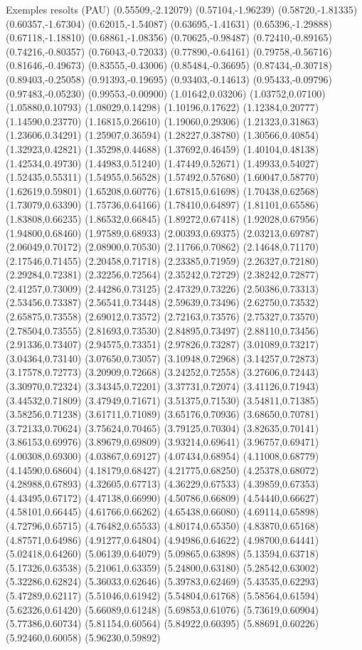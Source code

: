\documentclass[11pt,a4paper]{article}
\begin{document}
\begin{fmex}{Exemples resolts (PAU)}
(0.55509,-2.12079) (0.57104,-1.96239) (0.58720,-1.81335) (0.60357,-1.67304) (0.62015,-1.54087) (0.63695,-1.41631) (0.65396,-1.29888) (0.67118,-1.18810) (0.68861,-1.08356) (0.70625,-0.98487) (0.72410,-0.89165) (0.74216,-0.80357) (0.76043,-0.72033) (0.77890,-0.64161) (0.79758,-0.56716) (0.81646,-0.49673) (0.83555,-0.43006) (0.85484,-0.36695) (0.87434,-0.30718) (0.89403,-0.25058) (0.91393,-0.19695) (0.93403,-0.14613) (0.95433,-0.09796) (0.97483,-0.05230) (0.99553,-0.00900) (1.01642,0.03206) (1.03752,0.07100) (1.05880,0.10793) (1.08029,0.14298) (1.10196,0.17622) (1.12384,0.20777) (1.14590,0.23770) (1.16815,0.26610) (1.19060,0.29306) (1.21323,0.31863) (1.23606,0.34291) (1.25907,0.36594) (1.28227,0.38780) (1.30566,0.40854) (1.32923,0.42821) (1.35298,0.44688) (1.37692,0.46459) (1.40104,0.48138) (1.42534,0.49730) (1.44983,0.51240) (1.47449,0.52671) (1.49933,0.54027) (1.52435,0.55311) (1.54955,0.56528) (1.57492,0.57680) (1.60047,0.58770) (1.62619,0.59801) (1.65208,0.60776) (1.67815,0.61698) (1.70438,0.62568) (1.73079,0.63390) (1.75736,0.64166) (1.78410,0.64897) (1.81101,0.65586) (1.83808,0.66235) (1.86532,0.66845) (1.89272,0.67418) (1.92028,0.67956) (1.94800,0.68460) (1.97589,0.68933) (2.00393,0.69375) (2.03213,0.69787) (2.06049,0.70172) (2.08900,0.70530) (2.11766,0.70862) (2.14648,0.71170) (2.17546,0.71455) (2.20458,0.71718) (2.23385,0.71959) (2.26327,0.72180) (2.29284,0.72381) (2.32256,0.72564) (2.35242,0.72729) (2.38242,0.72877) (2.41257,0.73009) (2.44286,0.73125) (2.47329,0.73226) (2.50386,0.73313) (2.53456,0.73387) (2.56541,0.73448) (2.59639,0.73496) (2.62750,0.73532) (2.65875,0.73558) (2.69012,0.73572) (2.72163,0.73576) (2.75327,0.73570) (2.78504,0.73555) (2.81693,0.73530) (2.84895,0.73497) (2.88110,0.73456) (2.91336,0.73407) (2.94575,0.73351) (2.97826,0.73287) (3.01089,0.73217) (3.04364,0.73140) (3.07650,0.73057) (3.10948,0.72968) (3.14257,0.72873) (3.17578,0.72773) (3.20909,0.72668) (3.24252,0.72558) (3.27606,0.72443) (3.30970,0.72324) (3.34345,0.72201) (3.37731,0.72074) (3.41126,0.71943) (3.44532,0.71809) (3.47949,0.71671) (3.51375,0.71530) (3.54811,0.71385) (3.58256,0.71238) (3.61711,0.71089) (3.65176,0.70936) (3.68650,0.70781) (3.72133,0.70624) (3.75624,0.70465) (3.79125,0.70304) (3.82635,0.70141) (3.86153,0.69976) (3.89679,0.69809) (3.93214,0.69641) (3.96757,0.69471) (4.00308,0.69300) (4.03867,0.69127) (4.07434,0.68954) (4.11008,0.68779) (4.14590,0.68604) (4.18179,0.68427) (4.21775,0.68250) (4.25378,0.68072) (4.28988,0.67893) (4.32605,0.67713) (4.36229,0.67533) (4.39859,0.67353) (4.43495,0.67172) (4.47138,0.66990) (4.50786,0.66809) (4.54440,0.66627) (4.58101,0.66445) (4.61766,0.66262) (4.65438,0.66080) (4.69114,0.65898) (4.72796,0.65715) (4.76482,0.65533) (4.80174,0.65350) (4.83870,0.65168) (4.87571,0.64986) (4.91277,0.64804) (4.94986,0.64622) (4.98700,0.64441) (5.02418,0.64260) (5.06139,0.64079) (5.09865,0.63898) (5.13594,0.63718) (5.17326,0.63538) (5.21061,0.63359) (5.24800,0.63180) (5.28542,0.63002) (5.32286,0.62824) (5.36033,0.62646) (5.39783,0.62469) (5.43535,0.62293) (5.47289,0.62117) (5.51046,0.61942) (5.54804,0.61768) (5.58564,0.61594) (5.62326,0.61420) (5.66089,0.61248) (5.69853,0.61076) (5.73619,0.60904) (5.77386,0.60734) (5.81154,0.60564) (5.84922,0.60395) (5.88691,0.60226) (5.92460,0.60058) (5.96230,0.59892) 
\end{fmex}
\end{document}
